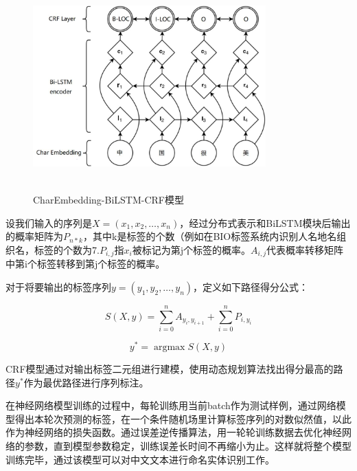 \documentclass[winfonts,master,oneside,nobackinfo]{njuthesis}
\begin{document}
\begin{figure}[ht]
\centering
\begin{minipage}[t]{\textwidth}
\includegraphics[width=0.8\textwidth,height=8cm]{./figure/CE-LSTM-CRF.jpg}
\caption{CharEmbedding-BiLSTM-CRF模型}
\label{lab:1}
\end{minipage}
\end{figure}

设我们输入的序列是$X=\left(x_{1}, x_{2}, \ldots, x_{n}\right)$，经过分布式表示和BiLSTM模块后输出的概率矩阵为$P_{n * k}$，其中k是标签的个数（例如在BIO标签系统内识别人名地名组织名，标签的个数为7.$P_{i, j}$指$x_{i}$被标记为第j个标签的概率。$A_{i, j}$代表概率转移矩阵中第i个标签转移到第j个标签的概率。

对于将要输出的标签序列$y=\left(y_{1}, y_{2}, \ldots, y_{n}\right)$，定义如下路径得分公式：

\begin{equation}
S(X, y)=\sum_{i=0}^{n} A_{y_{i}, y_{i+1}}+\sum_{i=0}^{n} P_{i, y_{i}} 
\end{equation}

\begin{equation}
y^{*}=\operatorname{argmax} S(X, y)
\end{equation}

CRF模型通过对输出标签二元组进行建模，使用动态规划算法找出得分最高的路径$y^{*}$作为最优路径进行序列标注。

在神经网络模型训练的过程中，每轮训练用当前batch作为测试样例，通过网络模型得出本轮次预测的标签，在一个条件随机场里计算标签序列的对数似然值，以此作为神经网络的损失函数。通过误差逆传播算法，用一轮轮训练数据去优化神经网络的参数，直到模型参数稳定，训练误差长时间不再缩小为止。这样就将整个模型训练完毕，通过该模型可以对中文文本进行命名实体识别工作。
\end{document}
